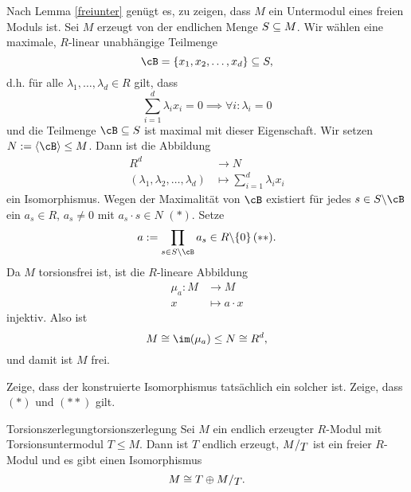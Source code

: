 \begin{beweis}
Nach Lemma \ref{freiunter} genügt es, zu zeigen, dass $M$ ein Untermodul eines freien Moduls ist. Sei $M$ erzeugt von der endlichen Menge $S \subseteq M$. Wir wählen eine maximale, $R$-linear unabhängige Teilmenge
\begin{equation}
\cB = \{x_1, x_2, \dots, x_d\} \sub S,
\end{equation}
d.h. für alle $\lambda_1, \dots, \lambda_d \in R$ gilt, dass 
\begin{equation}
\sum_{i=1}^d \lambda_i x_i=0 \implies \forall i: \lambda_i = 0
\end{equation}
und die Teilmenge $\cB \sub S$ ist maximal mit dieser Eigenschaft. Wir setzen $N:=\langle \cB \rangle \leq M$. Dann ist die Abbildung
\begin{equation}
\begin{split}
R^d &\to N \\
(\lambda_1, \lambda_2, \dots, \lambda_d) &\mapsto \sum_{i=1}^d \lambda_i x_i
\end{split}
\end{equation}
ein Isomorphismus. Wegen der Maximalität von $\cB$ existiert für jedes $s \in S \exc \cB$ ein $a_s \in R$, $a_s \neq 0$ mit $a_s \cdot s \in N$ $(\ast)$. Setze
\begin{equation}
a := \prod_{s \in S \exc \cB} a_s \in R \exc \{0\} \, (\ast \ast).
\end{equation}
Da $M$ torsionsfrei ist, ist die $R$-lineare Abbildung
\begin{equation}
\begin{split}
\mu_a: M &\to M\\
x &\mapsto a \cdot x
\end{split}
\end{equation}
injektiv. Also ist 
\begin{equation}
M \cong \im (\mu_a) \leq N \cong R^d,
\end{equation}
und damit ist $M$ frei.
\end{beweis}
\begin{übung}
Zeige, dass der konstruierte Isomorphismus tatsächlich ein solcher ist. Zeige, dass $(\ast)$ und $(\ast \ast)$ gilt.
\end{übung}
\begin{lemma}{Torsionszerlegung}{torsionszerlegung}
Sei $M$ ein endlich erzeugter $R$-Modul mit Torsionsuntermodul $T \leq M$. Dann ist $T$ endlich erzeugt, $\quotient{M}{T}$ ist ein freier $R$-Modul und es gibt einen Isomorphismus 
\begin{equation}
M \cong T \oplus \quotient{M}{T}.
\end{equation}
\end{lemma}
